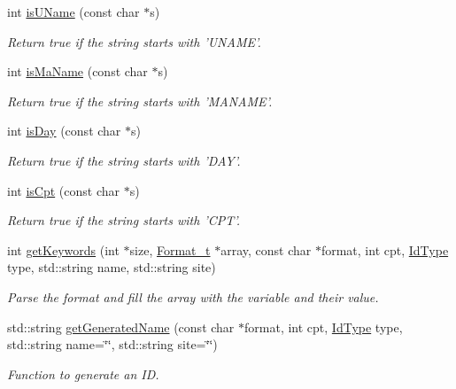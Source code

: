 \begin{DoxyCompactItemize}
int \hyperlink{namespacevishnu_ac123696febe0c4b8fa9f6d59daa6062b}{isUName} (const char $\ast$s)
\begin{DoxyCompactList}\small\item\em Return true if the string starts with 'UNAME'. \item\end{DoxyCompactList}\item 
int \hyperlink{namespacevishnu_ad10441f9e198c7d70038dcd74963dc54}{isMaName} (const char $\ast$s)
\begin{DoxyCompactList}\small\item\em Return true if the string starts with 'MANAME'. \item\end{DoxyCompactList}\item 
int \hyperlink{namespacevishnu_a11a59f26c9f250498ef8aed73e316c8b}{isDay} (const char $\ast$s)
\begin{DoxyCompactList}\small\item\em Return true if the string starts with 'DAY'. \item\end{DoxyCompactList}\item 
int \hyperlink{namespacevishnu_a9f8370bcc63bc78bd464447eecbee191}{isCpt} (const char $\ast$s)
\begin{DoxyCompactList}\small\item\em Return true if the string starts with 'CPT'. \item\end{DoxyCompactList}\item 
int \hyperlink{namespacevishnu_a04e3438b8bba4e8074e5102cccfd6cd1}{getKeywords} (int $\ast$size, \hyperlink{classFormat__t}{Format\_\-t} $\ast$array, const char $\ast$format, int cpt, \hyperlink{namespacevishnu_aff8a694c2bc2b55465a31b4bf00f58c1}{IdType} type, std::string name, std::string site)
\begin{DoxyCompactList}\small\item\em Parse the format and fill the array with the variable and their value. \item\end{DoxyCompactList}\item 
std::string \hyperlink{namespacevishnu_a1ac2452cabb31484e501d0e568a342c3}{getGeneratedName} (const char $\ast$format, int cpt, \hyperlink{namespacevishnu_aff8a694c2bc2b55465a31b4bf00f58c1}{IdType} type, std::string name=\char`\"{}\char`\"{}, std::string site=\char`\"{}\char`\"{})
\begin{DoxyCompactList}\small\item\em Function to generate an ID. \item\end{DoxyCompactList}\item 

\end{DoxyCompactItemize}
